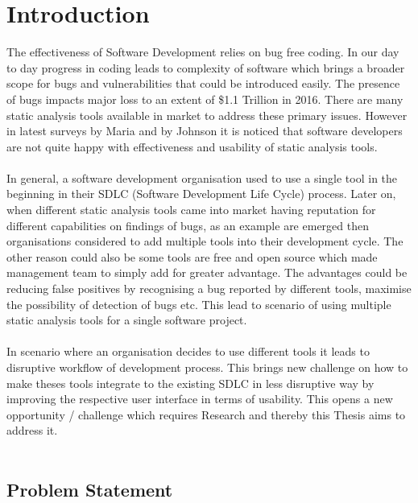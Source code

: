 \chapter{Introduction}
\label{ch:introduction}

The effectiveness of Software Development relies on bug free coding. In our day to day progress in coding leads to complexity of software which brings a broader scope for bugs and vulnerabilities that could be introduced easily. The presence of bugs impacts major loss to an extent of  \$1.1 Trillion in 2016. \cite{report} There are many static analysis tools available in market to address these primary issues. However in latest surveys by Maria \etal{} \cite{CB16} and by Johnson \etal{} \cite{JSMB13} it is noticed that software developers are not quite happy with effectiveness and usability of static analysis tools.
\\ \\

In general, a software development organisation used to use a single tool in the beginning in their SDLC (Software Development Life Cycle) process. Later on, when different static analysis tools came into market having reputation for different capabilities on findings of bugs, as an example are emerged then organisations considered to add multiple tools into their development cycle. The other reason could also be some tools are free and open source which made management team to simply add for greater advantage. The advantages could be reducing false positives by recognising a bug reported by different tools, maximise the possibility of detection of bugs etc. This lead to scenario of using multiple static analysis tools for a single software project.
\\ \\

In scenario where an organisation decides to use different tools it leads to disruptive workflow of development process. This brings new challenge on how to make theses tools integrate to the existing SDLC in less disruptive way by improving the respective user interface in terms of usability. This opens a new opportunity / challenge which requires Research and thereby this Thesis aims to address it.
\\ \\

\section{Problem Statement}

